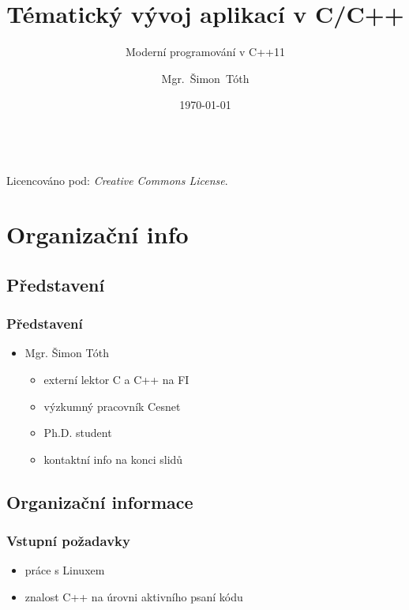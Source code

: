

\title{Tématický vývoj aplikací v C/C++}
\subtitle{Moderní programování v C++11}
\author[]{Mgr.~Šimon~Tóth}
\date{\today}

\newcommand{\CcNote}[1]{%
        Licencováno pod: \textit{Creative Commons #1 3.0 License}.%
}


	\begin{frame}
		\titlepage
		\vfill
		\begin{center}
			\\
			{\tiny\CcNote{\CcLongnameByNcSa}}
			\vspace*{2ex}
		\end{center}
	\end{frame}

\section{Organizační info}
\subsection{Představení}

\begin{frame}
	\frametitle{Představení}
	\begin{itemize}
		\item{Mgr. Šimon Tóth}
		\begin{itemize}
			\item{externí lektor C a C++ na FI}
			\item{výzkumný pracovník Cesnet}
			\item{Ph.D. student}
			\item{kontaktní info na konci slidů}
		\end{itemize}
	\end{itemize}
\end{frame}

\subsection{Organizační informace}

\begin{frame}
	\frametitle{Vstupní požadavky}
	\begin{itemize}
		\item{práce s Linuxem}
		\item{znalost C++ na úrovni aktivního psaní kódu}
	\end{itemize}
\end{frame}


